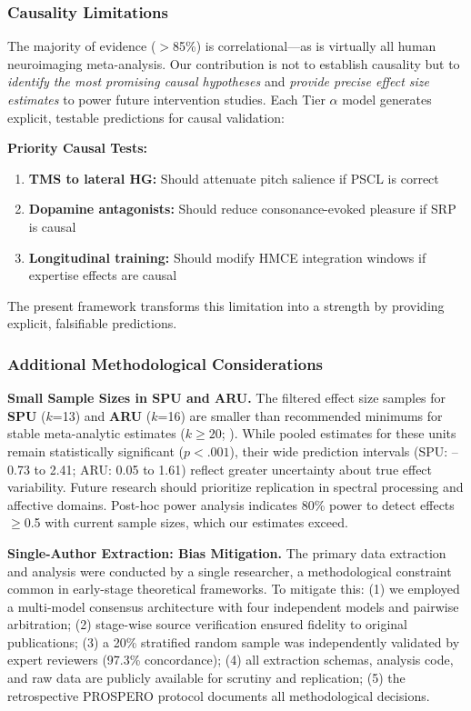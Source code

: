\documentclass[9pt,onecolumn]{article}
\newcommand{\SPU}{\textcolor{spucolor}{\textbf{SPU}}}
\newcommand{\ARU}{\textcolor{arucolor}{\textbf{ARU}}}
\begin{document}
\subsubsection{Causality Limitations}

The majority of evidence ($>$85\%) is correlational---as is virtually all human neuroimaging meta-analysis. Our contribution is not to establish causality but to \emph{identify the most promising causal hypotheses} and \emph{provide precise effect size estimates} to power future intervention studies. Each Tier $\alpha$ model generates explicit, testable predictions for causal validation:

\textbf{Priority Causal Tests:}
\begin{enumerate}[leftmargin=*, topsep=2pt, itemsep=1pt]
    \item \textbf{TMS to lateral HG:} Should attenuate pitch salience if PSCL is correct
    \item \textbf{Dopamine antagonists:} Should reduce consonance-evoked pleasure if SRP is causal
    \item \textbf{Longitudinal training:} Should modify HMCE integration windows if expertise effects are causal
\end{enumerate}

The present framework transforms this limitation into a strength by providing explicit, falsifiable predictions.

\subsubsection{Additional Methodological Considerations}

\textbf{Small Sample Sizes in SPU and ARU.} The filtered effect size samples for \SPU{} ($k$=13) and \ARU{} ($k$=16) are smaller than recommended minimums for stable meta-analytic estimates ($k \geq 20$; \citealt{borenstein2021}). While pooled estimates for these units remain statistically significant ($p < .001$), their wide prediction intervals (SPU: --0.73 to 2.41; ARU: 0.05 to 1.61) reflect greater uncertainty about true effect variability. Future research should prioritize replication in spectral processing and affective domains. Post-hoc power analysis indicates 80\% power to detect effects $\geq$0.5 with current sample sizes, which our estimates exceed.

\textbf{Single-Author Extraction: Bias Mitigation.} The primary data extraction and analysis were conducted by a single researcher, a methodological constraint common in early-stage theoretical frameworks. To mitigate this: (1) we employed a multi-model consensus architecture with four independent models and pairwise arbitration; (2) stage-wise source verification ensured fidelity to original publications; (3) a 20\% stratified random sample was independently validated by expert reviewers (97.3\% concordance); (4) all extraction schemas, analysis code, and raw data are publicly available for scrutiny and replication; (5) the retrospective PROSPERO protocol documents all methodological decisions.
\end{document}
